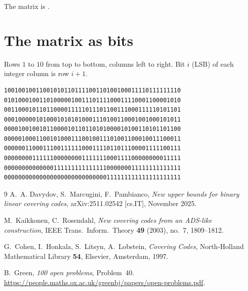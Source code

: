 \documentclass[11pt,a4paper]{article}
\begin{document}
The matrix is
\href{https://github.com/wustep/maths/blob/main/problems/covering/result/data/H_r10_n50.txt}{}.

\appendix
\section{The matrix as bits}

Rows $1$ to $10$ from top to bottom, columns left to right. Bit $i$
(LSB) of each integer column is row $i+1$.

{\small
\begin{verbatim}
10010010011001010110111100110100100011110111111110
01010001001101000001001110111100011110001100001010
00110001011011000011111011101100111000111110101101
00010000010100010101010001110100110001001000101011
00001001001011000010110110101000010100110101101100
00000100011001010001110010011101001100010011100011
00000011000111001111110001111011011100001111100111
00000000111111000000001111111000111100000000011111
00000000000000111111111111111000000011111111111111
00000000000000000000000000000111111111111111111111
\end{verbatim}
}

\begin{thebibliography}{9}
A.~A. Davydov, S.~Marcugini, F.~Pambianco,
\emph{New upper bounds for binary linear covering codes},
arXiv:2511.02542 [cs.IT], November 2025.

M.~Kaikkonen, C.~Rosendahl,
\emph{New covering codes from an ADS-like construction},
IEEE Trans.\ Inform.\ Theory \textbf{49} (2003), no.~7, 1809--1812.

G.~Cohen, I.~Honkala, S.~Litsyn, A.~Lobstein,
\emph{Covering Codes}, North-Holland Mathematical Library \textbf{54},
Elsevier, Amsterdam, 1997.

B.~Green, \emph{100 open problems}, Problem~40.
\url{https://people.maths.ox.ac.uk/greenbj/papers/open-problems.pdf}.
\end{thebibliography}
\end{document}
